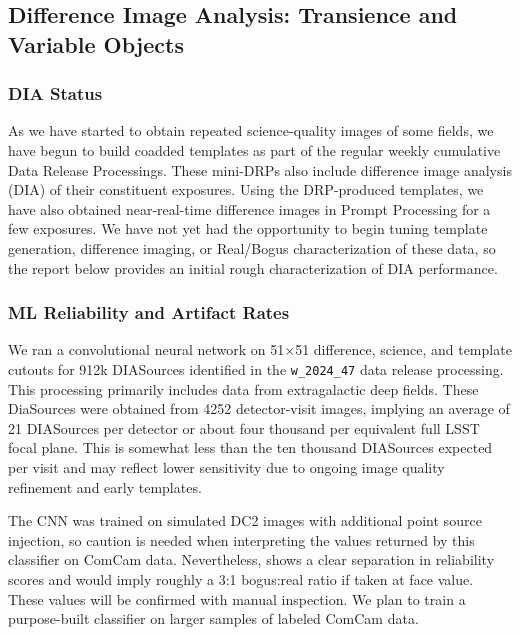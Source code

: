 \subsection{Difference Image Analysis: Transience and Variable Objects}
\label{sec:dia_transient_variable}


\subsubsection{DIA Status}

As we have started to obtain repeated science-quality images of some fields, we have begun to build coadded templates as part of the regular weekly cumulative Data Release Processings.
These mini-DRPs also include difference image analysis (DIA) of their constituent exposures.
Using the DRP-produced templates, we have also obtained near-real-time difference images in Prompt Processing for a few exposures.
We have not yet had the opportunity to begin tuning template generation, difference imaging, or Real/Bogus characterization of these data, so the report below provides an initial rough characterization of DIA performance.

\subsubsection{ML Reliability and Artifact Rates}

We ran a convolutional neural network on 51$\times$51 difference, science, and template cutouts for 912k DIASources identified in the \texttt{w\_2024\_47} data release processing.
This processing primarily includes data from extragalactic deep fields.
These DiaSources were obtained from 4252 detector-visit images, implying an average of 21 DIASources per detector or about four thousand per equivalent full LSST focal plane.
This is somewhat less than the ten thousand DIASources expected per visit and may reflect lower sensitivity due to ongoing image quality refinement and early templates.

The CNN was trained on simulated DC2 images with additional point source injection, so caution is needed when interpreting the values returned by this classifier on ComCam data.
Nevertheless,   shows a clear separation in reliability scores and would imply roughly a 3:1 bogus:real ratio if taken at face value.
These values will be confirmed with manual inspection.
We plan to train a purpose-built classifier on larger samples of labeled ComCam data.

